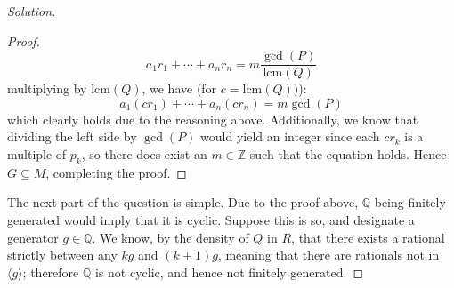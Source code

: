 \documentclass[12pt]{article}
\newcommand{\lcm}[1]{\text{lcm}(#1)}
\newenvironment{solution}
  {\renewcommand\qedsymbol{$\blacksquare$}\begin{proof}[Solution]}
{\end{proof}}
\newenvironment{sproof}{
  \renewcommand\qedsymbol{$\square$}
  \begin{proof}
  }{
  \end{proof}
}
\begin{document}
\begin{solution}
\begin{sproof}
    \begin{equation*}
      a_1r_1+\cdots+a_nr_n = m\frac{\gcd(P)}{\lcm{Q}}
    \end{equation*}
  multiplying by $\lcm{Q}$, we have (for $c=\lcm{Q})$):
    \begin{equation*}
      a_1(cr_1) + \cdots + a_n(cr_n) = m\gcd(P)
    \end{equation*}
    which clearly holds due to the reasoning above. 
    Additionally, we know that dividing the left side by $\gcd(P)$ would yield an integer since
    each $cr_k$ is a multiple of $p_k$, so there does exist an $m\in\mathbb{Z}$ such that the equation holds.
    Hence $G \subseteq M$, completing the proof.
  \end{sproof}
  The next part of the question is simple.
  Due to the proof above, $\mathbb{Q}$ being finitely generated would imply that it is cyclic.
  Suppose this is so, and designate a generator $g\in\mathbb{Q}$.
  We know, by the density of $Q$ in $R$, that there exists a rational strictly between any $kg$ and $(k+1)g$,
  meaning that there are rationals not in $\langle g\rangle$; therefore $\mathbb{Q}$ is not cyclic, and hence
  not finitely generated.
\end{solution}
\end{document}
